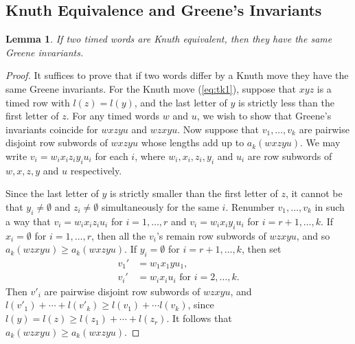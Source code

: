 \documentclass[10pt]{amsproc}
\newtheorem{lemma}[theorem]{Lemma}
\theoremstyle{definition}
\theoremstyle{remark}
\begin{document}
\subsection{Knuth Equivalence and Greene's Invariants}
\label{sec:knuth-equiv-green}
\begin{lemma}
  \label{lemma:Knuth-Greene}
  If two timed words are Knuth equivalent, then they have the same Greene invariants.
\end{lemma}
\begin{proof}
  It suffices to prove that if two words differ by a Knuth move they have the same Greene invariants.
  For the Knuth move (\ref{eq:tk1}), suppose that $xyz$ is a timed row with $l(z)=l(y)$, and the last letter of $y$ is strictly less than the first letter of $z$.
  For any timed words $w$ and $u$, we wish to show that Greene's invariants coincide for $wxzyu$ and $wzxyu$.
  Now suppose that $v_1,\dotsc,v_k$ are pairwise disjoint row subwords of $wxzyu$ whose lengths add up to $a_k(wxzyu)$.
  We may write $v_i=w_ix_iz_iy_iu_i$ for each $i$, where $w_i,x_i,z_i,y_i$ and $u_i$ are row subwords of $w,x,z,y$ and $u$ respectively.

  Since the last letter of $y$ is strictly smaller than the first letter of $z$, it cannot be that $y_i\neq \emptyset$ and $z_i\neq \emptyset$ simultaneously for the same $i$.
  Renumber $v_1,\dotsc,v_k$ in such a way that $v_i=w_ix_iz_iu_i$ for $i=1,\dotsc,r$ and $v_i=w_ix_iy_iu_i$ for $i=r+1,\dotsc,k$.
  If $x_i=\emptyset$ for $i=1,\dotsc,r$, then all the $v_i$'s remain row subwords of $wzxyu$, and so $a_k(wzxyu)\geq a_k(wxzyu)$.
  If $y_i=\emptyset$ for $i=r+1,\dotsc,k$, then set
  \begin{align*}
    v_1'&=w_1x_1yu_1,\\
    v_i'&=w_ix_iu_i \text{ for } i=2,\dotsc,k.
  \end{align*}
  Then $v'_i$ are pairwise disjoint row subwords of $wzxyu$, and $l(v'_1)+\dotsb + l(v'_k)\geq l(v_1)+\dotsb l(v_k)$, since $l(y)=l(z)\geq l(z_1)+\dotsb + l(z_r)$.
  It follows that $a_k(wzxyu)\geq a_k(wxzyu)$.


\end{proof}
\end{document}
